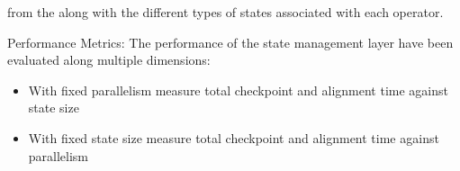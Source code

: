 

from the along with the different types of states associated with each operator.

\par{Performance Metrics:} The performance of the state management layer have been evaluated along multiple dimensions:
\begin{itemize}
    \item With fixed parallelism measure total checkpoint and alignment time against state size
    \item With fixed state size measure total checkpoint and alignment time against parallelism
\end{itemize}


